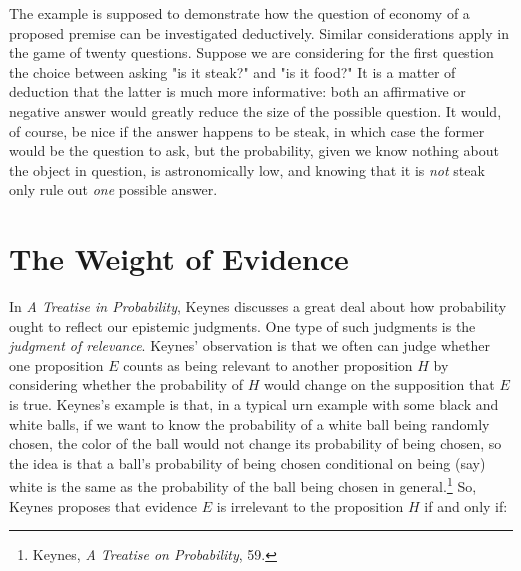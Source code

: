 The example is supposed to demonstrate how the question of economy of a proposed premise can be investigated deductively. Similar considerations apply in the game of twenty questions. Suppose we are considering for the first question the choice between asking "is it steak?" and "is it food?" It is a matter of deduction that the latter is much more informative: both an affirmative or negative answer would greatly reduce the size of the possible question. It would, of course, be nice if the answer happens to be steak, in which case the former would be the question to ask, but the probability, given we know nothing about the object in question, is astronomically low, and knowing that it is \emph{not} steak only rule out \emph{one} possible answer. 



%
%



\hypertarget{the-weight-of-evidence-1}{
\section{The Weight of Evidence}\label{the-weight-of-evidence-1}
}

In \emph{A Treatise in Probability}, Keynes discusses a great deal about
how probability ought to reflect our epistemic judgments. One type of
such judgments is the \emph{judgment of relevance}. Keynes' observation
is that we often can judge whether one proposition \(E\) counts as being
relevant to another proposition \(H\) by considering whether the
probability of \(H\) would change on the supposition that \(E\) is true.
Keynes's example is that, in a typical urn example with some black and
white balls, if we want to know the probability of a white ball being
randomly chosen, the color of the ball would not change its probability
of being chosen, so the idea is that a ball's probability of being
chosen conditional on being (say) white is the same as the probability
of the ball being chosen in general.\footnote{Keynes, \emph{A Treatise
  on Probability}, 59.} So, Keynes proposes that evidence \(E\) is
irrelevant to the proposition \(H\) if and only if:

